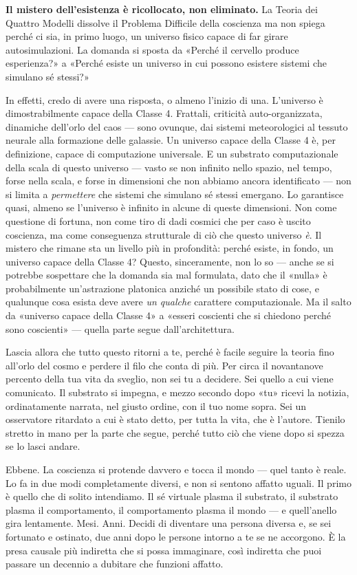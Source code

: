 \documentclass[11pt, twoside, openright]{book}
\begin{document}
\textbf{Il mistero dell'esistenza è ricollocato, non eliminato.} La Teoria dei Quattro Modelli dissolve il Problema Difficile della coscienza ma non spiega perché ci sia, in primo luogo, un universo fisico capace di far girare autosimulazioni. La domanda si sposta da «Perché il cervello produce esperienza?» a «Perché esiste un universo in cui possono esistere sistemi che simulano sé stessi?»

In effetti, credo di avere una risposta, o almeno l'inizio di una. L'universo è dimostrabilmente capace della Classe 4. Frattali, criticità auto-organizzata, dinamiche dell'orlo del caos --- sono ovunque, dai sistemi meteorologici al tessuto neurale alla formazione delle galassie. Un universo capace della Classe 4 è, per definizione, capace di computazione universale. E un substrato computazionale della scala di questo universo --- vasto se non infinito nello spazio, nel tempo, forse nella scala, e forse in dimensioni che non abbiamo ancora identificato --- non si limita a \textit{permettere} che sistemi che simulano sé stessi emergano. Lo garantisce quasi, almeno se l'universo è infinito in alcune di queste dimensioni. Non come questione di fortuna, non come tiro di dadi cosmici che per caso è uscito coscienza, ma come conseguenza strutturale di ciò che questo universo \textit{è}. Il mistero che rimane sta un livello più in profondità: perché esiste, in fondo, un universo capace della Classe 4? Questo, sinceramente, non lo so --- anche se si potrebbe sospettare che la domanda sia mal formulata, dato che il «nulla» è probabilmente un'astrazione platonica anziché un possibile stato di cose, e qualunque cosa esista deve avere \textit{un qualche} carattere computazionale. Ma il salto da «universo capace della Classe 4» a «esseri coscienti che si chiedono perché sono coscienti» --- quella parte segue dall'architettura.

Lascia allora che tutto questo ritorni a te, perché è facile seguire la teoria fino all'orlo del cosmo e perdere il filo che conta di più. Per circa il novantanove percento della tua vita da sveglio, non sei tu a decidere. Sei quello a cui viene comunicato. Il substrato si impegna, e mezzo secondo dopo «tu» ricevi la notizia, ordinatamente narrata, nel giusto ordine, con il tuo nome sopra. Sei un osservatore ritardato a cui è stato detto, per tutta la vita, che è l'autore. Tienilo stretto in mano per la parte che segue, perché tutto ciò che viene dopo si spezza se lo lasci andare.

Ebbene. La coscienza si protende davvero e tocca il mondo --- quel tanto è reale. Lo fa in due modi completamente diversi, e non si sentono affatto uguali. Il primo è quello che di solito intendiamo. Il sé virtuale plasma il substrato, il substrato plasma il comportamento, il comportamento plasma il mondo --- e quell'anello gira lentamente. Mesi. Anni. Decidi di diventare una persona diversa e, se sei fortunato e ostinato, due anni dopo le persone intorno a te se ne accorgono. È la presa causale più indiretta che si possa immaginare, così indiretta che puoi passare un decennio a dubitare che funzioni affatto.
\end{document}
